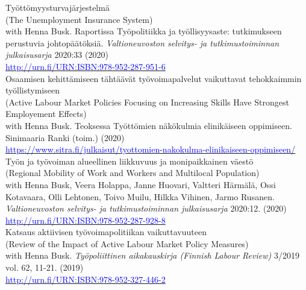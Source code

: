 \documentclass[16pt]{article}
\begin{document}
\noindent Ty\"{o}tt\"{o}myysturvaj\"{a}rjestelm\"{a} \\
\noindent (The Unemployment Insurance System) \\
\noindent with Henna Busk. Raportissa Ty\"{o}politiikka ja ty\"{o}llisyysaste: tutkimukseen perustuvia johtop\"{a}\"{a}t\"{o}ksi\"{a}. \textit{Valtioneuvoston selvitys- ja tutkimustoiminnan julkaisusarja} 2020:33 (2020) \\
\noindent  \href{http://urn.fi/URN:ISBN:978-952-287-951-6}{\textcolor{blue}{http://urn.fi/URN:ISBN:978-952-287-951-6}} \\

\noindent Osaamisen kehitt\"{a}miseen t\"{a}ht\"{a}\"{a}v\"{a}t ty\"{o}voimapalvelut vaikuttavat tehokkaimmin ty\"{o}llistymiseen \\
\noindent (Active Labour Market Policies Focusing on Increasing Skills Have Strongest Employement Effects) \\
\noindent with Henna Busk. Teoksessa Työttömien näkökulmia elinikäiseen oppimiseen. Sinimaaria Ranki (toim.) (2020)  \\
\noindent  \href{https://www.sitra.fi/julkaisut/tyottomien-nakokulma-elinikaiseen-oppimiseen/}{\textcolor{blue}{https://www.sitra.fi/julkaisut/tyottomien-nakokulma-elinikaiseen-oppimiseen/}} \\

\noindent Ty\"{o}n ja ty\"{o}voiman alueellinen liikkuvuus ja monipaikkainen v\"{a}est\"{o} \\
\noindent (Regional Mobility of Work and Workers and Multilocal Population) \\
\noindent with Henna Busk, Veera Holappa, Janne Huovari, Valtteri H\"{a}rm\"{a}l\"{a}, Ossi Kotavaara, Olli Lehtonen, Toivo Muilu, Hilkka Vihinen, Jarmo Rusanen. \textit{Valtioneuvoston selvitys- ja tutkimustoiminnan julkaisusarja} 2020:12. (2020)  \\
\noindent \href{http://urn.fi/URN:ISBN:978-952-287-928-8}{\textcolor{blue}{http://urn.fi/URN:ISBN:978-952-287-928-8}} \\

\noindent Katsaus aktiivisen ty\"{o}voimapolitiikan vaikuttavuuteen \\
\noindent (Review of the Impact of Active Labour Market Policy Measures) \\
\noindent with Henna Busk. \textit{Ty\"{o}poliittinen aikakauskirja (Finnish Labour Review)} 3/2019 vol. 62, 11-21.  (2019) \\
\noindent \href{http://urn.fi/URN:ISBN:978-952-327-446-2}{\textcolor{blue}{http://urn.fi/URN:ISBN:978-952-327-446-2}} \\
\end{document}
